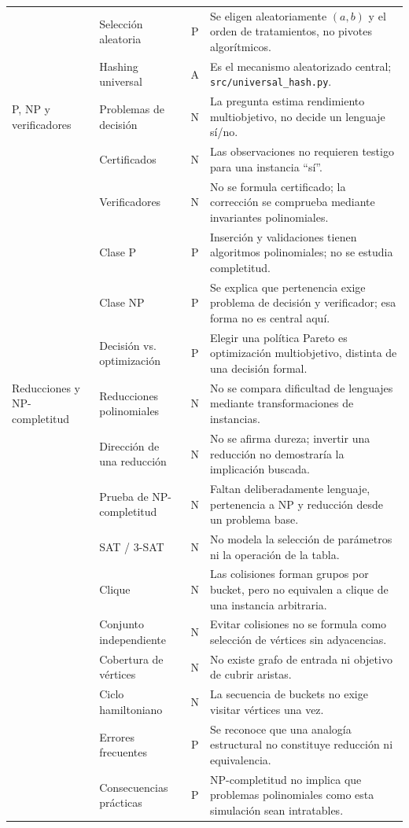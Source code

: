 \begin{longtable}{p{2.7cm}p{3.4cm}c p{6.2cm}}
& Selección aleatoria & P & Se eligen aleatoriamente $(a,b)$ y el orden de tratamientos, no pivotes algorítmicos.\\
& Hashing universal & A & Es el mecanismo aleatorizado central; \texttt{src/universal\_hash.py}.\\
\midrule
P, NP y verificadores & Problemas de decisión & N & La pregunta estima rendimiento multiobjetivo, no decide un lenguaje sí/no.\\
& Certificados & N & Las observaciones no requieren testigo para una instancia ``sí''.\\
& Verificadores & N & No se formula certificado; la corrección se comprueba mediante invariantes polinomiales.\\
& Clase P & P & Inserción y validaciones tienen algoritmos polinomiales; no se estudia completitud.\\
& Clase NP & P & Se explica que pertenencia exige problema de decisión y verificador; esa forma no es central aquí.\\
& Decisión vs. optimización & P & Elegir una política Pareto es optimización multiobjetivo, distinta de una decisión formal.\\
\midrule
Reducciones y NP-completitud & Reducciones polinomiales & N & No se compara dificultad de lenguajes mediante transformaciones de instancias.\\
& Dirección de una reducción & N & No se afirma dureza; invertir una reducción no demostraría la implicación buscada.\\
& Prueba de NP-completitud & N & Faltan deliberadamente lenguaje, pertenencia a NP y reducción desde un problema base.\\
& SAT / 3-SAT & N & No modela la selección de parámetros ni la operación de la tabla.\\
& Clique & N & Las colisiones forman grupos por bucket, pero no equivalen a clique de una instancia arbitraria.\\
& Conjunto independiente & N & Evitar colisiones no se formula como selección de vértices sin adyacencias.\\
& Cobertura de vértices & N & No existe grafo de entrada ni objetivo de cubrir aristas.\\
& Ciclo hamiltoniano & N & La secuencia de buckets no exige visitar vértices una vez.\\
& Errores frecuentes & P & Se reconoce que una analogía estructural no constituye reducción ni equivalencia.\\
& Consecuencias prácticas & P & NP-completitud no implica que problemas polinomiales como esta simulación sean intratables.\\

\end{longtable}
